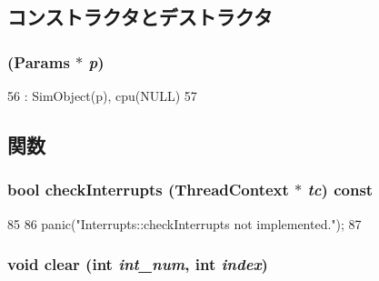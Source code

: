 \subsection{コンストラクタとデストラクタ}
\hypertarget{classPowerISA_1_1Interrupts_a3d148759405b99148e0c34750966edb1}{
\subsubsection[{Interrupts}]{ ({\bf Params} $\ast$ {\em p})}}
\label{classPowerISA_1_1Interrupts_a3d148759405b99148e0c34750966edb1}



\begin{DoxyCode}
56                            : SimObject(p), cpu(NULL)
57     {}
\end{DoxyCode}


\subsection{関数}
\hypertarget{classPowerISA_1_1Interrupts_af3c66fb49fec598cf78aaec29d764952}{
\subsubsection[{checkInterrupts}]{\setlength{\rightskip}{0pt plus 5cm}bool checkInterrupts ({\bf ThreadContext} $\ast$ {\em tc}) const}}
\label{classPowerISA_1_1Interrupts_af3c66fb49fec598cf78aaec29d764952}



\begin{DoxyCode}
85     {
86         panic("Interrupts::checkInterrupts not implemented.\n");
87     }
\end{DoxyCode}
\hypertarget{classPowerISA_1_1Interrupts_af60c3484087379d0330467d77f6cbaae}{
\subsubsection[{clear}]{\setlength{\rightskip}{0pt plus 5cm}void clear (int {\em int\_\-num}, \/  int {\em index})}}
\label{classPowerISA_1_1Interrupts_af60c3484087379d0330467d77f6cbaae}



